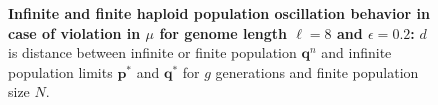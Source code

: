 \begin{figure}[H]
\begin{center}
\hspace{5pt}
\hspace{5pt}


\caption{\textbf{Infinite and finite haploid population oscillation behavior in case of violation in $\mu$ for genome length $\ell = 8$ and $\epsilon = 0.2$:} $d$ is
  distance between infinite or finite population ${\bm q}^n$ and infinite
  population limits ${{\bm p}^\ast}$ and ${{\bm q}^{\ast}}$ for $g$ generations and finite population size $N$.}
\label{oscillation_8h_vio_mu_0.2}
\end{center}
\end{figure}

